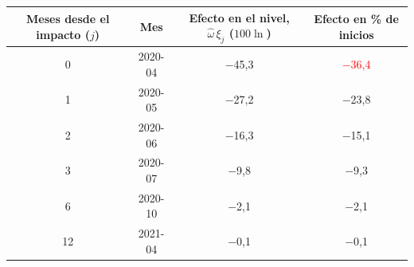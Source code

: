 \begin{tabular}{cccc}
\toprule
Meses desde el impacto ($j$) & Mes & Efecto en el nivel, $\hat\omega\,\xi_j$ ($100\ln$) & Efecto en \% de inicios
\\ \midrule
0 & 2020-04 & \ensuremath{-}45{,}3 & \textcolor{red}{\ensuremath{-}36{,}4} \\
1 & 2020-05 & \ensuremath{-}27{,}2 & \ensuremath{-}23{,}8 \\
2 & 2020-06 & \ensuremath{-}16{,}3 & \ensuremath{-}15{,}1 \\
3 & 2020-07 & \ensuremath{-}9{,}8 & \ensuremath{-}9{,}3 \\
6 & 2020-10 & \ensuremath{-}2{,}1 & \ensuremath{-}2{,}1 \\
12 & 2021-04 & \ensuremath{-}0{,}1 & \ensuremath{-}0{,}1 \\
\bottomrule
\end{tabular}
